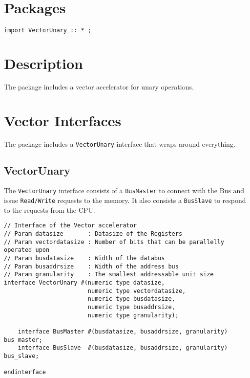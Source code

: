 \begin{paper}
\renewcommand*{\pagemark}{}

\section*{Packages\sdot}
\texttt{import VectorUnary :: * ;}
\section*{Description\sdot}
The package includes a vector accelerator for unary operations.
\section*{Vector Interfaces\sdot}
The package includes a \texttt{VectorUnary} interface that wraps around everything. 

\subsection*{VectorUnary\sdot}
The \texttt{VectorUnary} interface consists of a \texttt{BusMaster} to connect with the Bus and issue \texttt{Read/Write} requests to the memory. It also consists a \texttt{BusSlave} to respond to the requests from the CPU.

\begin{verbatim}
// Interface of the Vector accelerator
// Param datasize       : Datasize of the Registers
// Param vectordatasize : Number of bits that can be parallelly operated upon
// Param busdatasize    : Width of the databus
// Param busaddrsize    : Width of the address bus
// Param granularity    : The smallest addressable unit size
interface VectorUnary #(numeric type datasize,
                        numeric type vectordatasize,
                        numeric type busdatasize,
                        numeric type busaddrsize,
                        numeric type granularity);

    interface BusMaster #(busdatasize, busaddrsize, granularity) bus_master;
    interface BusSlave  #(busdatasize, busaddrsize, granularity) bus_slave;
    
endinterface

\end{verbatim}\\\\




\end{paper}
